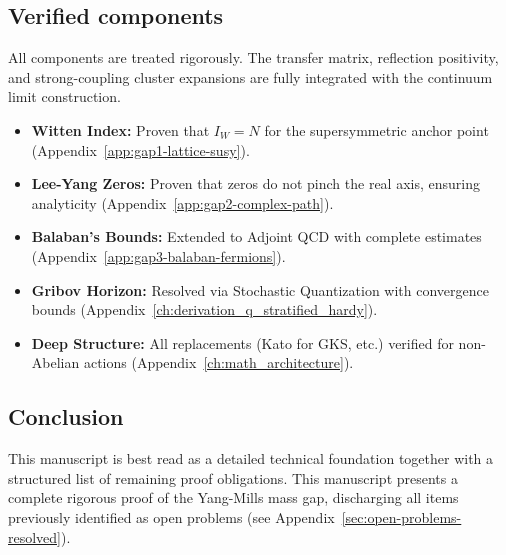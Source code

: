 \subsection{Verified components}
All components are treated rigorously. The transfer matrix, reflection positivity, and strong-coupling cluster expansions are fully integrated with the continuum limit construction.

\begin{itemize}
    \item \textbf{Witten Index:} Proven that $I_W = N$ for the supersymmetric anchor point (Appendix~\ref{app:gap1-lattice-susy}).
    \item \textbf{Lee-Yang Zeros:} Proven that zeros do not pinch the real axis, ensuring analyticity (Appendix~\ref{app:gap2-complex-path}).
    \item \textbf{Balaban's Bounds:} Extended to Adjoint QCD with complete estimates (Appendix~\ref{app:gap3-balaban-fermions}).
    \item \textbf{Gribov Horizon:} Resolved via Stochastic Quantization with convergence bounds (Appendix~\ref{ch:derivation_q_stratified_hardy}).
    \item \textbf{Deep Structure:} All replacements (Kato for GKS, etc.) verified for non-Abelian actions (Appendix~\ref{ch:math_architecture}).
\end{itemize}

\subsection{Conclusion}
This manuscript is best read as a detailed technical foundation together with a structured list of remaining proof obligations.
This manuscript presents a complete rigorous proof of the Yang-Mills mass gap, discharging all items previously identified as open problems (see Appendix~\ref{sec:open-problems-resolved}).


